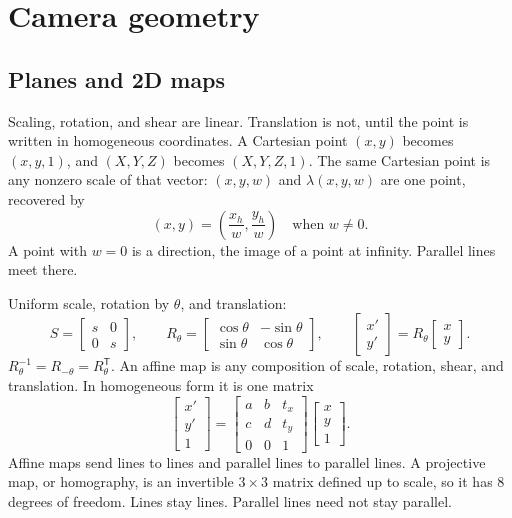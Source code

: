 \documentclass[11pt]{article}
\begin{document}
\section{Camera geometry}

\subsection{Planes and 2D maps}

Scaling, rotation, and shear are linear. Translation is not, until the point is written in homogeneous coordinates. A Cartesian point $(x,y)$ becomes $(x,y,1)$, and $(X,Y,Z)$ becomes $(X,Y,Z,1)$. The same Cartesian point is any nonzero scale of that vector: $(x,y,w)$ and $\lambda(x,y,w)$ are one point, recovered by
\begin{equation}
(x,y)=\left(\frac{x_h}{w},\frac{y_h}{w}\right)
\quad\text{when }w\neq 0.
\end{equation}
A point with $w=0$ is a direction, the image of a point at infinity. Parallel lines meet there.

Uniform scale, rotation by $\theta$, and translation:
\begin{equation}
S=
\begin{bmatrix} s & 0 \\ 0 & s \end{bmatrix},
\qquad
R_\theta=
\begin{bmatrix}
\cos\theta & -\sin\theta \\
\sin\theta & \cos\theta
\end{bmatrix},
\qquad
\begin{bmatrix} x' \\ y' \end{bmatrix}
=
R_\theta
\begin{bmatrix} x \\ y \end{bmatrix}.
\end{equation}
$R_\theta^{-1}=R_{-\theta}=R_\theta^{\mathsf T}$. An affine map is any composition of scale, rotation, shear, and translation. In homogeneous form it is one matrix
\begin{equation}
\begin{bmatrix} x' \\ y' \\ 1 \end{bmatrix}
=
\begin{bmatrix}
a & b & t_x \\
c & d & t_y \\
0 & 0 & 1
\end{bmatrix}
\begin{bmatrix} x \\ y \\ 1 \end{bmatrix}.
\end{equation}
Affine maps send lines to lines and parallel lines to parallel lines. A projective map, or homography, is an invertible $3\times 3$ matrix defined up to scale, so it has $8$ degrees of freedom. Lines stay lines. Parallel lines need not stay parallel.
\end{document}
